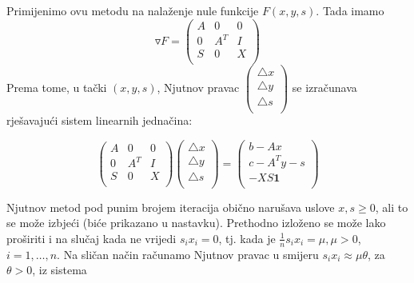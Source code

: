 \documentclass[a4paper, utf8, 11pt, colorlinks]{article}
\begin{document}
Primijenimo ovu metodu na nalaženje nule funkcije $F(x,y,s)$. Tada imamo
$$ \triangledown F =\left ( \begin{array}{ccc}
	A   & 0      &  0      \\
	0   & A^T    &  I      \\
	S   & 0      & X       \\
\end{array} \right ) 
$$
Prema tome, u tački $(x,y,s)$, Njutnov pravac
$
\begin{pmatrix}
	\bigtriangleup  x  \\
	\bigtriangleup  y  \\
	\bigtriangleup  s  \\
\end{pmatrix}
$
se izračunava rješavajući sistem linearnih jednačina:

\begin{equation}
	\begin{pmatrix}
		A   & 0      &  0      \\
		0   & A^T    &  I      \\
		S   & 0      & X       \\
	\end{pmatrix}  
	\begin{pmatrix} 
		\bigtriangleup  x  \\
		\bigtriangleup  y  \\
		\bigtriangleup  s  \\
	\end{pmatrix} 
	= 
	\begin{pmatrix} 
		b - Ax             \\
		c - A^T y - s      \\
		- X S \textbf{1}  \\                   
	\end{pmatrix} 
\end{equation}

Njutnov metod pod punim brojem iteracija obično narušava uslove $x,s \geq 0$, ali to se može izbjeći (biće prikazano u nastavku).  
Prethodno izloženo se može lako proširiti i na slučaj kada ne vrijedi $s_ix_i = 0$, tj. kada je $\frac{1}{n}s_ix_i = \mu, \mu > 0$, $i=1,\ldots,n$. Na sličan način računamo Njutnov pravac u smijeru $s_i x_i \approx \mu \theta$, za  $\theta >0$, iz sistema 
\end{document}
